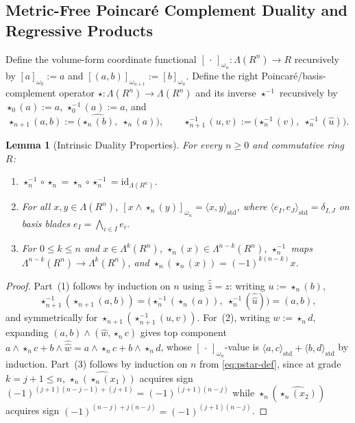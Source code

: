 \documentclass[11pt]{article}
\newtheorem{lemma}[theorem]{Lemma}
\theoremstyle{definition}
\begin{document}
\subsection{Metric-Free Poincar\'e Complement Duality and Regressive Products}

Define the volume-form coordinate functional $[\,\cdot\,]_{\omega_n} : \Lambda(R^n) \to R$ recursively by $[a]_{\omega_0} := a$ and $[(a,b)]_{\omega_{n+1}} := [b]_{\omega_n}$. Define the right Poincar\'e/basis-complement operator $\star : \Lambda(R^n) \to \Lambda(R^n)$ and its inverse $\star^{-1}$ recursively by $\star_0(a) := a$, $\star_0^{-1}(a) := a$, and
\begin{equation}\label{eq:pstar-def}
  \star_{n+1}(a, b) := \bigl(\widehat{\star_n(b)},\; \star_n(a)\bigr), \qquad
  \star_{n+1}^{-1}(u, v) := \bigl(\star_n^{-1}(v),\; \star_n^{-1}(\hat{u})\bigr).
\end{equation}

\begin{lemma}[Intrinsic Duality Properties]\label{lem:pstar}
For every $n \ge 0$ and commutative ring $R$:
\begin{enumerate}
  \item $\star_n^{-1} \circ \star_n = \star_n \circ \star_n^{-1} = \mathrm{id}_{\Lambda(R^n)}$.
  \item For all $x, y \in \Lambda(R^n)$, $[x \wedge \star_n(y)]_{\omega_n} = \langle x, y \rangle_{\mathrm{std}}$, where $\langle e_I, e_J \rangle_{\mathrm{std}} = \delta_{I,J}$ on basis blades $e_I = \bigwedge_{i \in I} e_i$.
  \item For $0 \le k \le n$ and $x \in \Lambda^k(R^n)$, $\star_n(x) \in \Lambda^{n-k}(R^n)$, $\star_n^{-1}$ maps $\Lambda^{n-k}(R^n) \to \Lambda^k(R^n)$, and $\star_n(\star_n(x)) = (-1)^{k(n-k)} x$.
\end{enumerate}
\end{lemma}
\begin{proof}
Part~(1) follows by induction on $n$ using $\hat{\hat{z}} = z$: writing $u := \star_n(b)$,
\[
  \star_{n+1}^{-1}(\star_{n+1}(a,b)) = \bigl(\star_n^{-1}(\star_n(a)),\; \star_n^{-1}(\hat{\hat{u}})\bigr) = (a,b),
\]
and symmetrically for $\star_{n+1}(\star_{n+1}^{-1}(u,v))$. For~(2), writing $w := \star_n d$, expanding $(a,b) \wedge (\hat{w}, \star_n c)$ gives top component $a \wedge \star_n c + b \wedge \hat{\hat{w}} = a \wedge \star_n c + b \wedge \star_n d$, whose $[\,\cdot\,]_{\omega_n}$-value is $\langle a,c\rangle_{\mathrm{std}} + \langle b,d\rangle_{\mathrm{std}}$ by induction. Part~(3) follows by induction on $n$ from \eqref{eq:pstar-def}, since at grade $k = j+1 \le n$, $\widehat{\star_n(\star_n(x_1))}$ acquires sign $(-1)^{(j+1)(n-j-1) + (j+1)} = (-1)^{(j+1)(n-j)}$ while $\star_n(\widehat{\star_n(x_2)})$ acquires sign $(-1)^{(n-j) + j(n-j)} = (-1)^{(j+1)(n-j)}$.
\end{proof}
\end{document}
